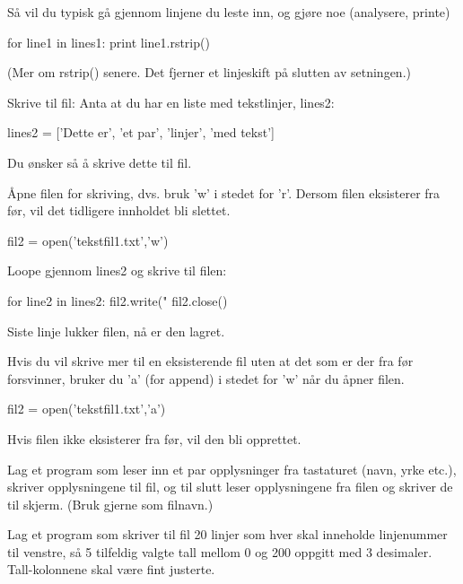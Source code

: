 Så vil du typisk gå gjennom linjene du leste inn, og gjøre noe (analysere, printe)
\begin{usncodebox}
for line1 in lines1:
    print line1.rstrip()
\end{usncodebox}

(Mer om rstrip() senere. Det fjerner et linjeskift på slutten av setningen.)

Skrive til fil: 
Anta at du har en liste med tekstlinjer, lines2:

\begin{usncodebox}
lines2 = ['Dette er', 'et par', 'linjer', 'med tekst']
\end{usncodebox}

Du ønsker så å skrive dette til fil.

Åpne filen for skriving, dvs. bruk 'w' i stedet for 'r'. Dersom filen eksisterer fra før, vil det tidligere innholdet bli slettet.

\begin{usncodebox}
fil2 = open('tekstfil1.txt','w')    
\end{usncodebox}

Loope gjennom lines2 og skrive til filen:
\begin{usncodebox}
for line2 in lines2:
    fil2.write("%
fil2.close()
\end{usncodebox}

Siste linje lukker filen, nå er den lagret. 

Hvis du vil skrive mer til en eksisterende fil uten at det som er der fra før forsvinner, bruker du 'a' (for append) i stedet for 'w' når du åpner filen.

\begin{usncodebox}
fil2 = open('tekstfil1.txt','a')
\end{usncodebox}

Hvis filen ikke eksisterer fra før, vil den bli opprettet. 
 
\begin{exercise}
Lag et program som leser inn et par opplysninger fra tastaturet (navn, yrke etc.), skriver opplysningene til fil, og til slutt leser 
opplysningene fra filen og skriver de til skjerm. (Bruk gjerne  som filnavn.)
\end{exercise}

\begin{exercise}
Lag et program som skriver til fil 20 linjer som hver skal inneholde linjenummer til venstre, så 5 tilfeldig valgte tall mellom 0 og 200 oppgitt med 3 desimaler. Tall-kolonnene skal være fint justerte.
\end{exercise}

